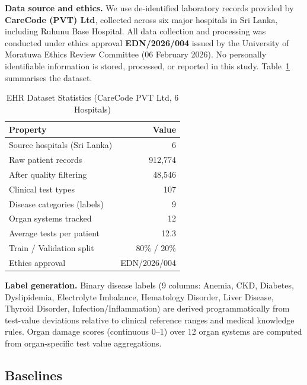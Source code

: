 \documentclass[conference]{IEEEtran}
\begin{document}
\textbf{Data source and ethics.}
We use de-identified laboratory records provided by
\textbf{CareCode (PVT) Ltd}, collected across six major hospitals in Sri
Lanka, including Ruhunu Base Hospital.
All data collection and processing was conducted under ethics approval
\textbf{EDN/2026/004} issued by the University of Moratuwa Ethics Review
Committee (06 February 2026).
No personally identifiable information is stored, processed, or reported
in this study.
Table~\ref{tab:dataset} summarises the dataset.

\begin{table}[h]
  \caption{EHR Dataset Statistics (CareCode PVT Ltd, 6 Hospitals)}
  \label{tab:dataset}
  \centering
  \begin{tabular}{lr}
    \toprule
    \textbf{Property}            & \textbf{Value}   \\
    \midrule
    Source hospitals (Sri Lanka) & 6                \\
    Raw patient records          & 912,774          \\
    After quality filtering      & 48,546           \\
    Clinical test types          & 107              \\
    Disease categories (labels)  & 9                \\
    Organ systems tracked        & 12               \\
    Average tests per patient    & 12.3             \\
    Train / Validation split     & 80\% / 20\%      \\
    Ethics approval              & EDN/2026/004     \\
    \bottomrule
  \end{tabular}
\end{table}

\textbf{Label generation.}
Binary disease labels (9 columns: Anemia, CKD, Diabetes, Dyslipidemia,
Electrolyte Imbalance, Hematology Disorder, Liver Disease, Thyroid Disorder,
Infection/Inflammation) are derived programmatically from test-value
deviations relative to clinical reference ranges and medical knowledge rules.
Organ damage scores (continuous 0--1) over 12 organ systems are computed
from organ-specific test value aggregations.

\subsection{Baselines}
\label{subsec:baselines}
\end{document}
